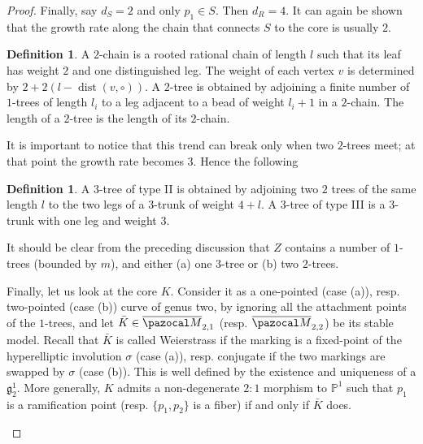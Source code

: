 \documentclass[11pt]{amsart}
\newcommand{\PP}{\mathbb P}
\newcommand{\oM}{\overline{\pazocal M}}
\theoremstyle{plain}
\theoremstyle{definition}
\newtheorem{dfn}[thm]{Definition}
\begin{document}
\begin{proof}
Finally, say $d_S=2$ and only $p_1\in S$. Then $d_R=4$. It can again be shown that the growth rate along the chain that connects $S$ to the core is usually $2$.
\begin{dfn}
 A $2$-chain is a rooted rational chain of length $l$ such that its leaf has weight $2$ and one distinguished leg. The weight of each vertex $v$ is determined by $2+2(l-\operatorname{dist}(v,\circ))$. A $2$-tree is obtained by adjoining a finite number of $1$-trees of length $l_i$ to a leg adjacent to a bead of weight $l_i+1$ in a $2$-chain. The length of a $2$-tree is the length of its $2$-chain.
\end{dfn}
It is important to notice that this trend can break only when two $2$-trees meet; at that point the growth rate becomes $3$. Hence the following
\begin{dfn}
 A $3$-tree of type II is obtained by adjoining two $2$ trees of the same length $l$ to the two legs of a $3$-trunk of weight $4+l$. A $3$-tree of type III is a $3$-trunk with one leg and weight $3$.
\end{dfn}
It should be clear from the preceding discussion that $Z$ contains a number of $1$-trees (bounded by $m$), and either (a) one $3$-tree or (b) two $2$-trees.

Finally, let us look at the core $K$. Consider it as a one-pointed (case (a)), resp. two-pointed (case (b)) curve of genus two, by ignoring all the attachment points of the $1$-trees, and let $\bar K\in\oM_{2,1}$ (resp. $\oM_{2,2}$) be its stable model. Recall that $\bar K$ is called Weierstrass if the marking is a fixed-point of the hyperelliptic involution $\sigma$ (case (a)), resp. conjugate if the two markings are swapped by $\sigma$ (case (b)). This is well defined by the existence and uniqueness of a $\mathfrak g^1_2$. More generally, $K$ admits a non-degenerate $2:1$ morphism to $\PP^1$ such that $p_1$ is a ramification point (resp. $\{p_1,p_2\}$ is a fiber) if and only if $\bar K$ does.
\begin{enumerate}


\end{enumerate}
\end{proof}
\end{document}
